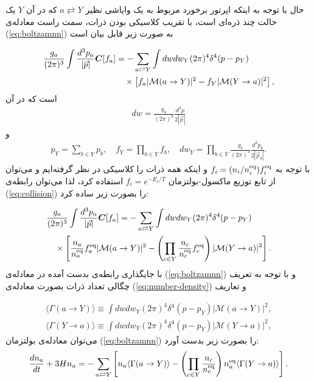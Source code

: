 \documentclass[a4paper]{book}
\begin{document}
حال با توجه به اینکه اپرتور برخورد مربوط به یک واپاشی نظیر {\footnotesize$a \rightleftarrows Y$} که در آن {\footnotesize$Y$} یک حالت چند ذره‌ای است، با تقریب کلاسیکی بودن ذرات، سمت راست معادله‌ی (\ref{eq:boltzamnn}) به صورت زیر قابل بیان است
\par
\vspace{-0.5cm}
{\footnotesize\begin{align}
	\frac{g_a}{(2\pi)^3} \int \frac{d^3p_a}{|\vec{p}|} \boldsymbol{C}[f_a]&=-\sum_{a \rightleftarrows Y} \int dw dw_Y (2\pi)^4 \delta^4 (p-p_Y)\notag\\
	&\quad \times \left[f_a |\mathcal{M}(a \to Y)|^2 - f_Y |\mathcal{M}(Y \to a) |^2\right],
	\label{eq:collision}
\end{align}}
است که در آن
{\footnotesize\begin{align}
	dw = \frac{g_a}{(2\pi)^3} \frac{d^3p}{2|\vec{p}|}
\end{align}}
و
{\footnotesize\begin{align}
	p_Y = \sum_{b \in Y} p_b, \quad
	f_Y = \prod_{b \in Y} f_b, \quad
	dw_Y = \prod_{b \in Y} \frac{g_b}{(2\pi)^3} \frac{d^3p_b}{2|\vec{p}_b|}.
\end{align}}
با توجه به {\footnotesize$f_i = (n_i/n_i^{\rm eq})f_i^{\rm eq}$} و اینکه همه ذرات را کلاسیکی در نظر گرفته‌ایم و می‌توان از تابع توزیع ماکسول-بولتزمان {\footnotesize$f_i = e^{-E_i/T}$} استفاده کرد، لذا می‌توان رابطه‌ی (\ref{eq:collision}) را بصورت زیر ساده کرد:
\par
\vspace{-0.5cm}
{\footnotesize\begin{align}
	&\frac{g_a}{(2\pi)^3} \int \frac{d^3p_a}{|\vec{p}|} \boldsymbol{C}[f_a]=-\sum_{a \rightleftarrows Y} \int dw dw_Y (2\pi)^4 \delta^4 (p-p_Y)\notag\\
	& \quad\times \left[\frac{n_a}{n_a^{\rm eq}} f_a^{\rm eq} |\mathcal{M}(a \to Y)|^2 - \left(\prod_{c\in Y} \frac{n_c}{n_c^{\rm eq}} f_c^{\rm eq}\right) |\mathcal{M}(Y \to a)|^2\right].
\end{align}}
با جایگذاری رابطه‌ی بدست آمده در معادله‌ی (\ref{eq:boltzamnn}) و با توجه به تعریف چگالی تعداد ذرات بصورت معادله‌ی (\ref{eq:number-density}) و تعاریف
\par
\vspace{-0.5cm}
{\footnotesize\begin{align}
	\langle \Gamma(a \to Y) \rangle \equiv \int dw dw_Y (2\pi)^4 \delta^4(p - p_Y) |\mathcal{M}(a \to Y)|^2,\\
	\langle \Gamma(Y \to a) \rangle \equiv \int dw dw_Y (2\pi)^4 \delta^4(p - p_Y) |\mathcal{M}(Y \to a)|^2,
\end{align}}
می‌توان معادله‌ی بولتزمان (\ref{eq:boltzamnn}) را بصورت زیر بدست آورد:
{\footnotesize\begin{align}
	\frac{dn_a}{dt}+3Hn_a = -\sum_{a \rightleftarrows Y}\left[n_a \langle\Gamma(a \to Y)\rangle - \left(\prod_{c\in Y} \frac{n_c}{n_c^{\rm eq}} \right) n_a^{\rm eq} \langle\Gamma(Y \to a)\rangle \right].
	\label{eq:bolzmannf}
\end{align}}
\end{document}
